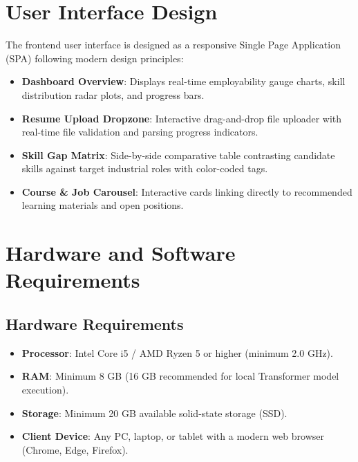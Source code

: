 \documentclass[12pt,a4paper]{report}
\begin{document}
\section{User Interface Design}
The frontend user interface is designed as a responsive Single Page Application (SPA) following modern design principles:
\begin{itemize}
    \item \textbf{Dashboard Overview}: Displays real-time employability gauge charts, skill distribution radar plots, and progress bars.
    \item \textbf{Resume Upload Dropzone}: Interactive drag-and-drop file uploader with real-time file validation and parsing progress indicators.
    \item \textbf{Skill Gap Matrix}: Side-by-side comparative table contrasting candidate skills against target industrial roles with color-coded tags.
    \item \textbf{Course \& Job Carousel}: Interactive cards linking directly to recommended learning materials and open positions.
\end{itemize}

\section{Hardware and Software Requirements}

\subsection{Hardware Requirements}
\begin{itemize}
    \item \textbf{Processor}: Intel Core i5 / AMD Ryzen 5 or higher (minimum 2.0 GHz).
    \item \textbf{RAM}: Minimum 8 GB (16 GB recommended for local Transformer model execution).
    \item \textbf{Storage}: Minimum 20 GB available solid-state storage (SSD).
    \item \textbf{Client Device}: Any PC, laptop, or tablet with a modern web browser (Chrome, Edge, Firefox).
\end{itemize}
\end{document}
